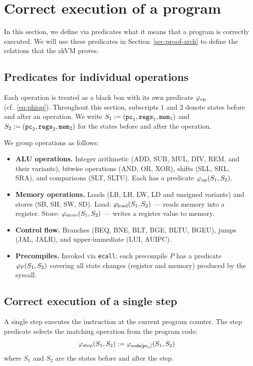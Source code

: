 \documentclass[11pt]{article}
\begin{document}
\section{Correct execution of a program}
In this section, we define via predicates what it means that a program is correctly executed. We will use these predicates in Section~\ref{sec:proof-arch} to define the relations that the zkVM proves.

\subsection{Predicates for individual operations}

Each operation is treated as a black box with its
own predicate $\varphi_{\mathrm{op}}$ (cf.~\eqref{eq:phiop}).
Throughout this section, subscripts $1$ and $2$ denote states before and after an operation.
We write $S_1:=(\mathtt{pc}_1,\mathtt{regs}_1,\mathtt{mem}_1)$ and
$S_2:=(\mathtt{pc}_2,\mathtt{regs}_2,\mathtt{mem}_2)$ for the states
before and after the operation.

We group operations as follows:
\begin{itemize}
\item \textbf{ALU operations.}
  Integer arithmetic (ADD, SUB, MUL, DIV, REM, and their variants),
  bitwise operations (AND, OR, XOR), shifts (SLL, SRL, SRA),
  and comparisons (SLT, SLTU).
  Each has a predicate $\varphi_{\mathrm{\mathrm{op}}}(S_1,S_2)$.
\item \textbf{Memory operations.}
  Loads (LB, LH, LW, LD and unsigned variants) and
  stores (SB, SH, SW, SD).
  Load: $\varphi_{\mathrm{load}}(S_1,S_2)$ --- reads memory into a register.
  Store: $\varphi_{\mathrm{store}}(S_1,S_2)$ --- writes a register value to memory.
\item \textbf{Control flow.}
  Branches (BEQ, BNE, BLT, BGE, BLTU, BGEU), jumps (JAL, JALR),
  and upper-immediate (LUI, AUIPC).
\item \textbf{Precompiles.}
  Invoked via \texttt{ecall}; each precompile $P$ has a predicate
  $\varphi_{\mathrm{P}}(S_1,S_2)$ covering all state changes
  (register and memory) produced by the syscall.
\end{itemize}

\subsection{Correct execution of a single step}

A single step executes the instruction at the current program counter.
The step predicate selects the matching operation from the program code:
\begin{equation*}\label{eq:step}
\varphi_{\mathrm{step}}(S_1,S_2):= \varphi_{\mathtt{code}[\mathtt{pc}_1]}(S_1,S_2)
\end{equation*}
where $S_1$ and $S_2$ are the states before and after the step.
\end{document}
